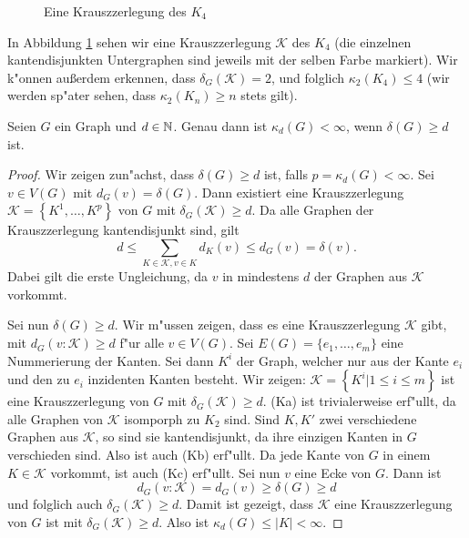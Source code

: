 \begin{example}
  \begin{figure}[htb]
    \centering
    \caption{Eine Krauszzerlegung des $K_4$}
    \label{fig:KrauszzerlegungK4}
  \end{figure}
  In Abbildung \ref{fig:KrauszzerlegungK4} sehen wir eine Krauszzerlegung $\mathcal{K}$ des $K_4$ (die einzelnen kantendisjunkten Untergraphen sind jeweils mit der selben Farbe markiert). Wir k"onnen au{\ss}erdem erkennen, dass $\delta_{G}(\mathcal{K}) = 2$, und folglich $\kappa_{2}(K_4) \leq 4$ (wir werden sp"ater sehen, dass $\kappa_{2}(K_n) \geq n$ stets gilt). 
\end{example}
\begin{lemma}
  Seien $G$ ein Graph und $d\in {\mathbb{N}}$. Genau dann ist $\kappa_{d}(G) < \infty$, wenn $\delta(G) \geq d$ ist. \label{lm:krauszexistenz}
\end{lemma}
\begin{proof}
  Wir zeigen zun"achst, dass $\delta(G) \geq d$ ist, falls $p = \kappa_d(G) < \infty$. Sei $v\in V(G)$ mit $d_{G}(v) = \delta(G)$. Dann existiert eine Krauszzerlegung $\mathcal{K}=\left\{ K^{1}, \dots , K^{p} \right\}$ von $G$ mit $\delta_{G}(\mathcal{K}) \geq d$. Da alle Graphen der Krauszzerlegung kantendisjunkt sind, gilt $$ d \leq \sum\limits_{K\in \mathcal{K}, v\in K} d_{K}(v) \leq d_{G}(v) = \delta(v).$$
  Dabei gilt die erste Ungleichung, da $v$ in mindestens $d$ der Graphen aus $\mathcal{K}$ vorkommt.

  Sei nun $\delta(G) \geq d$. Wir m"ussen zeigen, dass es eine Krauszzerlegung $\mathcal{K}$ gibt, mit
  $d_{G}(v:\mathcal{K}) \geq d$ f"ur alle $v\in V(G)$. Sei $E(G)= \{e_1,\dots, e_{m}\}$ eine Nummerierung der Kanten. Sei dann $K^i$ der Graph, welcher nur aus der Kante $e_i$ und den zu $e_i$ inzidenten Kanten besteht. Wir zeigen: $\mathcal{K} = \left\{ K^i | 1 \leq i \leq m \right\}$ ist eine Krauszzerlegung von $G$ mit $\delta_{G}(\mathcal{K}) \geq d$. (Ka) ist trivialerweise erf"ullt, da alle Graphen von $\mathcal{K}$ isomporph zu $K_{2}$ sind. Sind $K,K'$ zwei verschiedene Graphen aus $\mathcal{K}$, so sind sie
  kantendisjunkt, da ihre einzigen Kanten in $G$ verschieden sind. Also ist auch (Kb) erf"ullt. Da jede Kante von $G$ in einem $K\in \mathcal{K}$ vorkommt, ist auch (Kc) erf"ullt. Sei nun $v$ eine Ecke von $G$. Dann ist $$d_{G}(v:\mathcal{K}) = d_{G}(v) \geq \delta(G) \geq d$$ und folglich auch $\delta_{G}(\mathcal{K}) \geq d$. Damit ist gezeigt, dass $\mathcal{K}$ eine Krauszzerlegung von $G$ ist mit $\delta_{G}\left( \mathcal{K} \right) \geq d$. Also ist $\kappa_{d}(G) \leq |K| <
  \infty$.
\end{proof}

